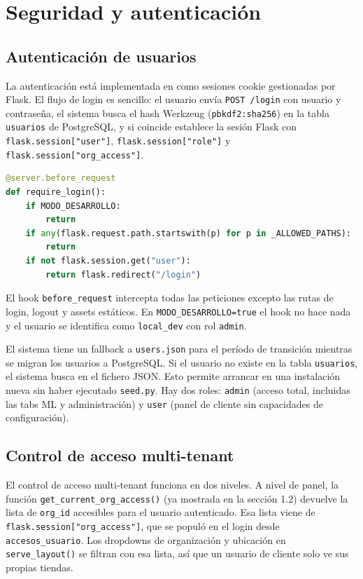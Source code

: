 \documentclass[12pt, a4paper]{article}
\begin{document}
\section{Seguridad y autenticación}

\subsection{Autenticación de usuarios}

La autenticación está implementada en  como sesiones cookie gestionadas por Flask. El flujo de login es sencillo: el usuario envía \texttt{POST /login} con usuario y contraseña, el sistema busca el hash Werkzeug (\texttt{pbkdf2:sha256}) en la tabla \texttt{usuarios} de PostgreSQL, y si coincide establece la sesión Flask con \texttt{flask.session["user"]}, \texttt{flask.session["role"]} y \texttt{flask.session["org\_access"]}.

\begin{lstlisting}[language=Python]
@server.before_request
def require_login():
    if MODO_DESARROLLO:
        return
    if any(flask.request.path.startswith(p) for p in _ALLOWED_PATHS):
        return
    if not flask.session.get("user"):
        return flask.redirect("/login")
\end{lstlisting}

El hook \texttt{before\_request} intercepta todas las peticiones excepto las rutas de login, logout y assets estáticos. En \texttt{MODO\_DESARROLLO=true} el hook no hace nada y el usuario se identifica como \texttt{local\_dev} con rol \texttt{admin}.

El sistema tiene un fallback a \texttt{users.json} para el período de transición mientras se migran los usuarios a PostgreSQL. Si el usuario no existe en la tabla \texttt{usuarios}, el sistema busca en el fichero JSON. Esto permite arrancar en una instalación nueva sin haber ejecutado \texttt{seed.py}. Hay dos roles: \texttt{admin} (acceso total, incluidas las tabs ML y administración) y \texttt{user} (panel de cliente sin capacidades de configuración).

\subsection{Control de acceso multi-tenant}

El control de acceso multi-tenant funciona en dos niveles. A nivel de panel, la función \texttt{get\_current\_org\_access()} (ya mostrada en la sección 1.2) devuelve la lista de \texttt{org\_id} accesibles para el usuario autenticado. Esa lista viene de \texttt{flask.session["org\_access"]}, que se populó en el login desde \texttt{accesos\_usuario}. Los dropdowns de organización y ubicación en \texttt{serve\_layout()} se filtran con esa lista, así que un usuario de cliente solo ve sus propias tiendas.
\end{document}

